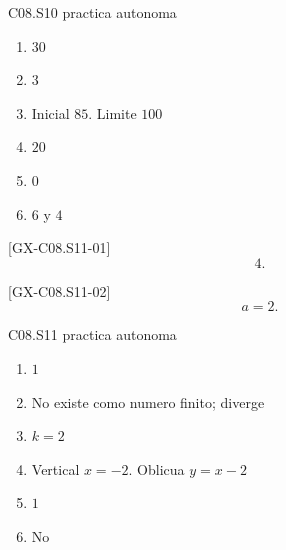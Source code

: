 \begin{shortanswer}{C08.S10 practica autonoma}
\begin{enumerate}[label=\textbf{PX-C08.S10-\arabic*:}, leftmargin=*]
  \item \(30\)
  \item \(3\)
  \item Inicial \(85\). Limite \(100\)
  \item \(20\)
  \item \(0\)
  \item \(6\) y \(4\)
\end{enumerate}
\end{shortanswer}

\begin{shortanswer}{[GX-C08.S11-01]}
\[
4.
\]
\end{shortanswer}

\begin{shortanswer}{[GX-C08.S11-02]}
\[
a=2.
\]
\end{shortanswer}

\begin{shortanswer}{C08.S11 practica autonoma}
\begin{enumerate}[label=\textbf{PX-C08.S11-\arabic*:}, leftmargin=*]
  \item \(1\)
  \item No existe como numero finito; diverge
  \item \(k=2\)
  \item Vertical \(x=-2\). Oblicua \(y=x-2\)
  \item \(1\)
  \item No
\end{enumerate}
\end{shortanswer}
